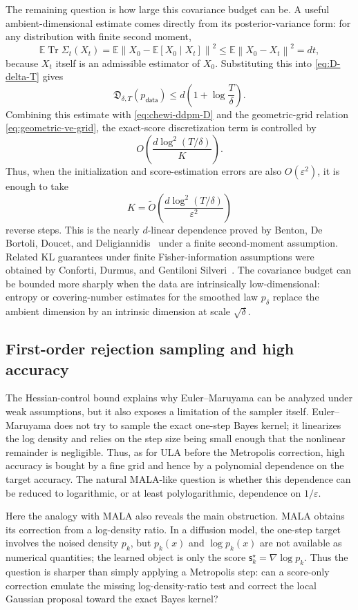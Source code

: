 \documentclass{amsart}
\numberwithin{equation}{section}
\theoremstyle{plain}
\theoremstyle{definition}
\theoremstyle{remark}
\DeclareMathOperator{\Tr}{Tr}
\newcommand{\E}{\mathbb{E}}
\newcommand{\eps}{\varepsilon}
\newcommand{\norm}[1]{\left\lVert #1 \right\rVert}
\newcommand{\pdata}{p_{\mathsf{data}}}
\newcommand{\sstar}{\mathsf{s}^{\star}}
\newcommand{\tO}{\widetilde O}
\begin{document}
The remaining question is how large this covariance budget can be.  A useful
ambient-dimensional estimate comes directly from its posterior-variance form:
for any distribution with finite second moment,
\[
    \E\Tr\Sigma_t(X_t)
    =
    \E\norm{X_0-\E[X_0\mid X_t]}^2
    \leq
    \E\norm{X_0-X_t}^2
    =
    dt,
\]
because $X_t$ itself is an admissible estimator of $X_0$.  Substituting this
into \eqref{eq:D-delta-T} gives
\[
    \mathfrak D_{\delta,T}(\pdata)
    \leq
    d\left(1+\log\frac{T}{\delta}\right).
\]
Combining this estimate with \eqref{eq:chewi-ddpm-D} and the geometric-grid
relation \eqref{eq:geometric-ve-grid}, the exact-score discretization term is
controlled by
\[
    O\!\left(
        \frac{d\log^2(T/\delta)}{K}
    \right).
\]
Thus, when the initialization and score-estimation errors are also
$O(\eps^2)$, it is enough to take
\[
    K=\tO\!\left(
        \frac{d\log^2(T/\delta)}{\eps^2}
    \right)
\]
reverse steps.  This is the nearly $d$-linear dependence proved by Benton,
De Bortoli, Doucet, and Deligiannidis~\cite{benton2024nearlydlinear} under a
finite second-moment assumption. Related KL guarantees under finite
Fisher-information assumptions were obtained by Conforti, Durmus, and
Gentiloni Silveri~\cite{conforti2024klscore}.  The covariance budget can be bounded
more sharply when the data are intrinsically low-dimensional: entropy or
covering-number estimates for the smoothed law $p_\delta$ replace the ambient
dimension by an intrinsic dimension at scale $\sqrt\delta$.

\subsection{First-order rejection sampling and high accuracy}

The Hessian-control bound explains why Euler--Maruyama can be analyzed under
weak assumptions, but it also exposes a limitation of the sampler itself.
Euler--Maruyama does not try to sample the exact one-step Bayes kernel; it
linearizes the log density and relies on the step size being small enough that
the nonlinear remainder is negligible.  Thus, as for ULA before the
Metropolis correction, high accuracy is bought by a fine grid and hence by a
polynomial dependence on the target accuracy.  The natural MALA-like question
is whether this dependence can be reduced to logarithmic, or at least
polylogarithmic, dependence on $1/\eps$.

Here the analogy with MALA also reveals the main obstruction.  MALA obtains its
correction from a log-density ratio.  In a diffusion model, the one-step target
involves the noised density $p_k$, but $p_k(x)$ and $\log p_k(x)$ are not
available as numerical quantities; the learned object is only the score
$\sstar_k=\nabla\log p_k$.  Thus the question is sharper than simply applying a
Metropolis step: can a score-only correction emulate the missing
log-density-ratio test and correct the local Gaussian proposal toward the exact
Bayes kernel?
\end{document}
